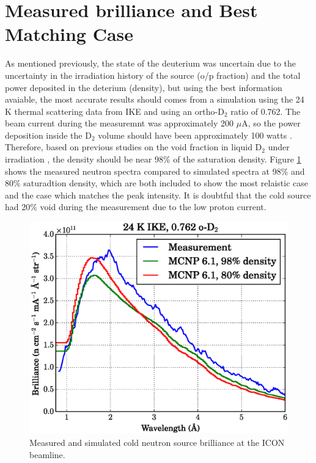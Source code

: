 \documentclass[5p,12pt]{elsarticle}
\begin{document}
%
%
%
%
%

\section{Measured brilliance and Best Matching Case}
\label{sec:results}

As mentioned previously, the state of the deuterium was uncertain due to the uncertainty in the irradiation history of the source (o/p fraction) and the total power deposited in the deterium (density), but using the best information avaiable, the most accurate results should comes from a simulation using the 24 K thermal scattering data from IKE and using an ortho-D$_2$ ratio of 0.762.  The beam current during the measuremnt was approximately 200 $\mu$A, so the power deposition inside the D$_2$ volume should have been approximately 100 watts \cite{sinq_power}.  Therefore, based on previous studies on the void fraction in liquid D$_2$ under irradiation \cite{Siegwarth_Olson_Lewis_Rowe_Williams_1994}, the density should be near 98\% of the saturation density.  Figure \ref{fig:brilliance} shows the measured neutron spectra compared to simulated spectra at 98\% and 80\% saturadtion density, which are both included to show the most relaistic case and the case which matches the peak intensity.  It is doubtful that the cold source had 20\% void during the measurement due to the low proton current.

\begin{figure}[h!] 
  \centering
    \includegraphics[width=\columnwidth]{graphics/brightness.eps}
     \caption{Measured and simulated cold neutron source brilliance at the ICON beamline. \label{fig:brilliance} }
\end{figure}
\end{document}
